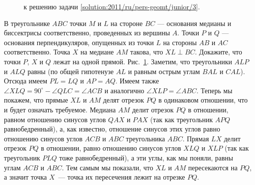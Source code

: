 \ifsolution
\begin{figure}\centering
    \caption{к решению задачи \ref{solution:2011/ru/pers-geomt/junior/3}.}
    \label{fig:solution:2011/ru/pers-geomt/junior/3}
\end{figure}
\fi %

\problem
В треугольнике $ABC$ точки $M$ и $L$ на стороне $BC$ --- основания медианы и
биссектрисы соответственно, проведенных из вершины $A$.
Точки $P$ и $Q$ --- основания перпендикуляров, опущенных из точки $L$ на
стороны $AB$ и $AC$ соответственно.
Точка $X$ на медиане $AM$ такова, что $XL \perp BC$.
Докажите, что точки $P$, $X$ и $Q$ лежат на одной прямой. 
\solution
\label{solution:2011/ru/pers-geomt/junior/3}%
Рис.~\ref{fig:solution:2011/ru/pers-geomt/junior/3}.
Заметим, что треугольники $ALP$ и $ALQ$ равны
(по общей гипотенузе $AL$ и равным острым углам $BAL$ и $CAL$).
Отсюда имеем $PL = LQ$ и $AP = AQ$.
Имеем также
$\angle XLQ = 90^\circ - \angle QLC = \angle ACB$
и аналогично $\angle XLP = \angle ABC$.
Теперь мы покажем, что прямые $XL$ и $AM$ делят отрезок $PQ$ в одинаковом
отношении, что и будет означать требуемое.
Медиана $AM$ делит отрезок $PQ$ в отношении, равном отношению синусов углов
$QAX$ и $PAX$ (так как треугольник $APQ$ равнобедренный), а, как известно,
отношение синусов этих углов равно отношению синусов углов $ACB$ и $ABC$
треугольника $ABC$.
Прямая $LX$ делит отрезок $PQ$ в отношении, равно отношению синусов углов $XLQ$
и $XLP$ (так как треугольник $PLQ$ тоже равнобедренный), а эти углы, как мы
поняли, равны углам $ACB$ и $ABC$.
Тем самым мы показали, что $XL$ и $AM$ пересекаются на $PQ$, а значит точка
$X$~--- точка их пересечения лежит на отрезке $PQ$.
\endproblem
